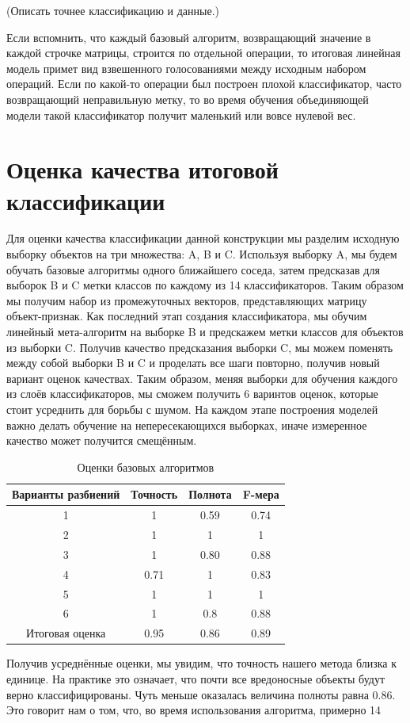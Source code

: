 (Описать точнее классификацию и данные.)

Если вспомнить, что каждый базовый алгоритм, возвращающий значение в каждой строчке матрицы, строится по отдельной операции, то итоговая линейная модель примет вид взвешенного голосованиями между исходным набором операций. Если по какой-то операции был построен плохой классификатор, часто возвращающий неправильную метку, то во время обучения объединяющей модели такой классификатор получит маленький или вовсе нулевой вес.

\section{Оценка качества итоговой классификации}

Для оценки качества классификации данной конструкции мы разделим исходную выборку объектов на три множества: A, B и C. Используя выборку A, мы будем обучать базовые алгоритмы одного ближайшего соседа, затем предсказав для выборок B и C метки классов по каждому из 14 классификаторов. Таким образом мы получим набор из промежуточных векторов, представляющих матрицу объект-признак. Как последний этап создания классификатора, мы обучим линейный мета-алгоритм на выборке B и предскажем метки классов для объектов из выборки C. Получив качество предсказания выборки C, мы можем поменять между собой выборки B и C и проделать все шаги повторно, получив новый вариант оценок качествах. Таким образом, меняя выборки для обучения каждого из слоёв классификаторов, мы сможем получить 6 варинтов оценок, которые стоит усреднить для борьбы с шумом. На каждом этапе построения моделей важно делать обучение на непересекающихся выборках, иначе измеренное качество может получится смещённым.

\bgroup
\def\arraystretch{1.5}%
\begin{table}[ht]
\caption{Оценки базовых алгоритмов}
\label{tab_weight}
\centering
    \begin{tabular}{|c|c|c|c|}
	\hline Варианты разбиений & Точность & Полнота & F-мера \\
	\hline 1 & 1 & 0.59 & 0.74 \\
	\hline 2 & 1 & 1 & 1 \\
	\hline 3 & 1 & 0.80 & 0.88 \\
	\hline 4 & 0.71 & 1 & 0.83 \\
	\hline 5 & 1 & 1 & 1 \\
	\hline 6 & 1 & 0.8 & 0.88 \\
	\hline Итоговая оценка & 0.95 & 0.86 & 0.89 \\
	\hline
    \end{tabular}
\end{table}
\egroup

Получив усреднённые оценки, мы увидим, что точность нашего метода близка к единице. На практике это означает, что почти все вредоносные объекты будут верно классифицированы. Чуть меньше оказалась величина полноты равна 0.86. Это говорит нам о том, что, во время использования алгоритма, примерно 14%